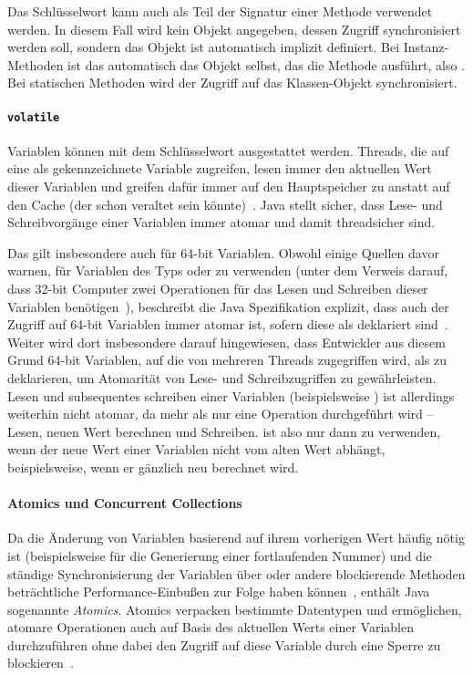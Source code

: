 Das Schlüsselwort  kann auch als Teil der Signatur einer Methode verwendet werden. In diesem Fall wird kein Objekt angegeben, dessen Zugriff synchronisiert werden soll, sondern das Objekt ist automatisch implizit definiert. Bei Instanz-Methoden ist das automatisch das Objekt selbst, das die Methode ausführt, also . Bei statischen Methoden wird der Zugriff auf das Klassen-Objekt synchronisiert.

\paragraph{\texttt{volatile}} Variablen können mit dem Schlüsselwort  ausgestattet werden. Threads, die auf eine als  gekennzeichnete Variable zugreifen, lesen immer den aktuellen Wert dieser Variablen und greifen dafür immer auf den Hauptspeicher zu anstatt auf den Cache (der schon veraltet sein könnte)~\cite[S.~30~ff.]{Friesen2015}. Java stellt sicher, dass Lese- und Schreibvorgänge einer  Variablen immer atomar und damit threadsicher sind.

Das gilt insbesondere auch für 64-bit Variablen. Obwohl einige Quellen davor warnen,  für Variablen des Typs  oder  zu verwenden (unter dem Verweis darauf, dass 32-bit Computer zwei Operationen für das Lesen und Schreiben dieser Variablen benötigen~\cite[S.~34]{Friesen2015}), beschreibt die Java Spezifikation explizit, dass auch der Zugriff auf 64-bit Variablen immer atomar ist, sofern diese als  deklariert sind~\cite{Java7Spec17}. Weiter wird dort insbesondere darauf hingewiesen, dass Entwickler aus diesem Grund 64-bit Variablen, auf die von mehreren Threads zugegriffen wird, als  zu deklarieren, um Atomarität von Lese- und Schreibzugriffen zu gewährleisten. Lesen und subsequentes schreiben einer  Variablen (beispielsweise ) ist allerdings weiterhin nicht atomar, da mehr als nur eine Operation durchgeführt wird -- Lesen, neuen Wert berechnen und Schreiben.  ist also nur dann zu verwenden, wenn der neue Wert einer Variablen nicht vom alten Wert abhängt, beispielsweise, wenn er gänzlich neu berechnet wird. 

\paragraph{Atomics und Concurrent Collections} Da die Änderung von Variablen basierend auf ihrem vorherigen Wert häufig nötig ist (beispielsweise für die Generierung einer fortlaufenden Nummer) und die ständige Synchronisierung der Variablen über  oder andere blockierende Methoden beträchtliche Performance-Einbußen zur Folge haben können~\cite[S.~130]{Friesen2015}, enthält Java sogenannte \emph{Atomics}. Atomics verpacken bestimmte Datentypen und ermöglichen, atomare Operationen auch auf Basis des aktuellen Werts einer Variablen durchzuführen ohne dabei den Zugriff auf diese Variable durch eine Sperre zu blockieren~\cite[S.~130]{Friesen2015}. 

